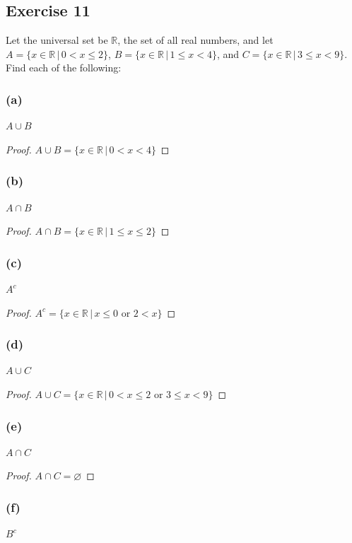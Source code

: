 \documentclass[14pt]{extarticle}
\newcommand{\es}{\varnothing}
\newcommand{\R}{\mathbb{R}}
\begin{document}
\subsection{Exercise 11}
Let the universal set be $\R$, the set of all real numbers, and let \(A = \{x \in \R \,|\, 0 < x \leq 2\}\), \(B = \{x 
\in \R \, | \, 1 \leq x < 4\}\), and \(C = \{x \in \R \, | \, 3 \leq x < 9\}\). Find each of the following:

\subsubsection{(a)}
$A \cup B$

\begin{proof}
\(A \cup B = \{x \in \R \, | \, 0 < x < 4\}\)
\end{proof}

\subsubsection{(b)}
$A \cap B$

\begin{proof}
\(A \cap B = \{x \in \R \, | \, 1 \leq x \leq 2\}\)
\end{proof}

\subsubsection{(c)}
$A^c$

\begin{proof}
\(A^c = \{x \in \R \, | \, x \leq 0 \text{ or } 2 < x\}\)
\end{proof}

\subsubsection{(d)}
$A \cup C$

\begin{proof}
\(A \cup C = \{x \in \R \, | \, 0 < x \leq 2 \text{ or } 3 \leq x < 9\}\)
\end{proof}

\subsubsection{(e)}
$A \cap C$

\begin{proof}
$A \cap C = \es$
\end{proof}

\subsubsection{(f)}
$B^c$
\end{document}
